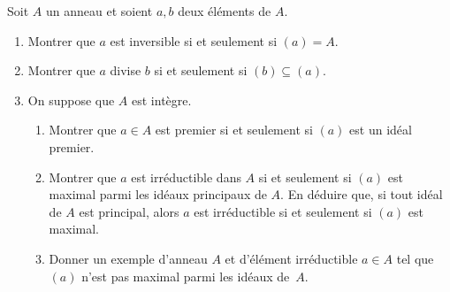 \documentclass[./main]{subfiles}
\begin{document}
  \begin{enonce}
    Soit $A$ un anneau et soient $a, b$ deux éléments de $A$.
    \begin{enumerate}
      \item Montrer que $a$ est inversible si et seulement si $(a) = A$.
      \item Montrer que $a$ divise $b$ si et seulement si $(b) \subseteq (a)$.
      \item On suppose que $A$ est intègre.
        \begin{enumerate}
          \item Montrer que $a \in A$ est premier si et seulement si $(a)$ est un idéal premier.
          \item Montrer que $a$ est irréductible dans $A$ si et seulement si $(a)$ est maximal parmi les idéaux principaux de $A$. En déduire que, si tout idéal de $A$ est principal, alors $a$ est irréductible si et seulement si $(a)$ est maximal.
          \item Donner un exemple d'anneau $A$ et d'élément irréductible $a \in A$ tel que $(a)$ n'est pas maximal parmi les idéaux de~$A$.
        \end{enumerate}
    \end{enumerate}
  \end{enonce}
\end{document}
